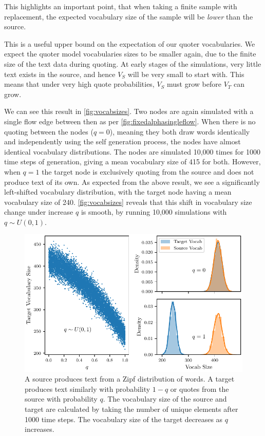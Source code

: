 This highlights an important point, that when taking a finite sample with replacement, the expected vocabulary size of the sample will be \emph{lower} than the source.

This is a useful upper bound on the expectation of our quoter vocabularies. We expect the quoter model vocabularies sizes to be smaller again, due to the finite size of the text data during quoting. At early stages of the simulations, very little text exists in the source, and hence $V_S$ will be very small to start with. This means that under very high quote probabilities, $V_S$ must grow before $V_T$ can grow. 

We can see this result in \autoref{fig:vocabsizes}. Two nodes are again simulated with a single flow edge between then as per \autoref{fig:fixedalphasingleflow}. When there is no quoting between the nodes ($q=0$), meaning they both draw words identically and independently using the self generation process, the nodes have almost identical vocabulary distributions. The nodes are simulated 10,000 times for 1000 time steps of generation, giving a mean vocabulary size of 415 for both. However, when $q=1$ the target node is exclusively quoting from the source and does not produce text of its own. As expected from the above result, we see a significantly left-shifted vocabulary distribution, with the target node having a mean vocabulary size of 240. \autoref{fig:vocabsizes} reveals that this shift in vocabulary size change under increase $q$ is smooth, by running 10,000 simulations with $q \sim U(0,1)$.

\begin{figure}[!htbp]
\centering
\includegraphics{chapter3/figs/VocabChangePlot.pdf}
\caption{A source produces text from a Zipf distribution of words. A target produces text similarly with probability $1-q$ or quotes from the source with probability $q$. The vocabulary size of the source and target are calculated by taking the number of unique elements after 1000 time steps. The vocabulary size of the target decreases as $q$ increases.}\label{fig:vocabsizes}
\end{figure}

